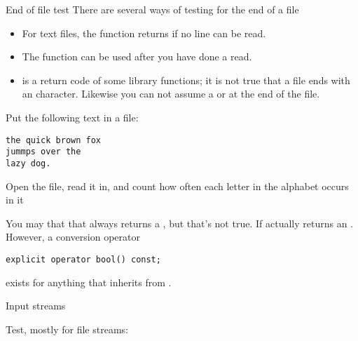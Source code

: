 \begin{block}{End of file test}
  There are several ways of testing for the end of a file
  \begin{itemize}
  \item For text files, the  function returns
     if no line can be read.
  \item The  function can be used after you have done
    a read.
  \item {} is a return code of some library
    functions; it is not true that a file ends with an 
    character.
    Likewise you can not assume a
     or  at the end of the file.
  \end{itemize}
\end{block}

\begin{exercise}
  \label{ex:foxcount}
  Put the following text in a file:
\begin{verbatim}
the quick brown fox
jummps over the
lazy dog.
\end{verbatim}
  Open the file, read it in, and count how often each letter in the
  alphabet occurs in it
\end{exercise}

\begin{advanced}
  You may that that  always returns a , but that's
  not true. If actually returns an . However, a conversion operator
\begin{verbatim}
explicit operator bool() const;
\end{verbatim}
  exists for anything that inherits from .
\end{advanced}

 {Input streams}

Test, mostly for file streams:  

